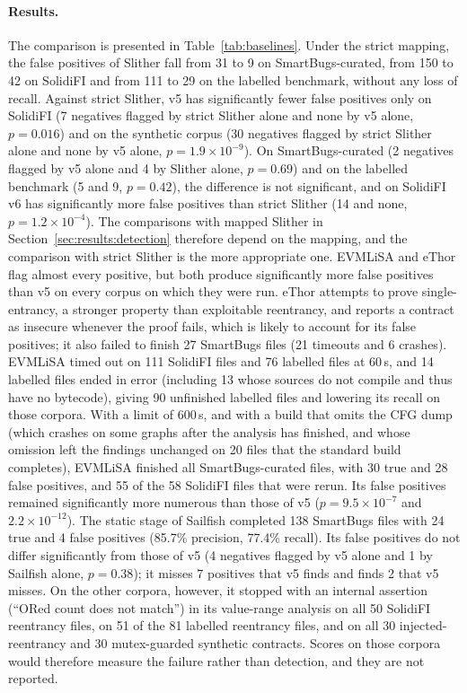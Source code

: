 \documentclass[pdflatex,sn-mathphys]{sn-jnl}
\theoremstyle{thmstyletwo}
\theoremstyle{thmstyletwo}
\begin{document}
\paragraph{Results.} The comparison is presented in Table~\ref{tab:baselines}. Under the strict mapping, the false positives of Slither fall from 31 to 9 on SmartBugs-curated, from 150 to 42 on SolidiFI and from 111 to 29 on the labelled benchmark, without any loss of recall. Against strict Slither, v5 has significantly fewer false positives only on SolidiFI (7 negatives flagged by strict Slither alone and none by v5 alone, $p = 0.016$) and on the synthetic corpus (30 negatives flagged by strict Slither alone and none by v5 alone, $p = 1.9 \times 10^{-9}$). On SmartBugs-curated (2 negatives flagged by v5 alone and 4 by Slither alone, $p = 0.69$) and on the labelled benchmark (5 and 9, $p = 0.42$), the difference is not significant, and on SolidiFI v6 has significantly more false positives than strict Slither (14 and none, $p = 1.2 \times 10^{-4}$). The comparisons with mapped Slither in Section~\ref{sec:results:detection} therefore depend on the mapping, and the comparison with strict Slither is the more appropriate one. EVMLiSA and eThor flag almost every positive, but both produce significantly more false positives than v5 on every corpus on which they were run. eThor attempts to prove single-entrancy, a stronger property than exploitable reentrancy, and reports a contract as insecure whenever the proof fails, which is likely to account for its false positives; it also failed to finish 27 SmartBugs files (21 timeouts and 6 crashes). EVMLiSA timed out on 111 SolidiFI files and 76 labelled files at 60\,s, and 14 labelled files ended in error (including 13 whose sources do not compile and thus have no bytecode), giving 90 unfinished labelled files and lowering its recall on those corpora. With a limit of 600\,s, and with a build that omits the CFG dump (which crashes on some graphs after the analysis has finished, and whose omission left the findings unchanged on 20 files that the standard build completes), EVMLiSA finished all SmartBugs-curated files, with 30 true and 28 false positives, and 55 of the 58 SolidiFI files that were rerun. Its false positives remained significantly more numerous than those of v5 ($p = 9.5 \times 10^{-7}$ and $2.2 \times 10^{-12}$). The static stage of Sailfish completed 138 SmartBugs files with 24 true and 4 false positives (85.7\% precision, 77.4\% recall). Its false positives do not differ significantly from those of v5 (4 negatives flagged by v5 alone and 1 by Sailfish alone, $p = 0.38$); it misses 7 positives that v5 finds and finds 2 that v5 misses. On the other corpora, however, it stopped with an internal assertion (``ORed count does not match'') in its value-range analysis on all 50 SolidiFI reentrancy files, on 51 of the 81 labelled reentrancy files, and on all 30 injected-reentrancy and 30 mutex-guarded synthetic contracts. Scores on those corpora would therefore measure the failure rather than detection, and they are not reported.
\end{document}
